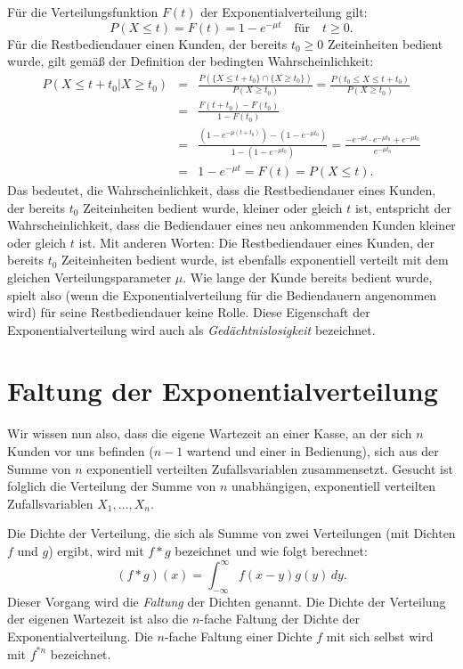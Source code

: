 \documentclass[a4paper,11pt,oneside]{article}
\begin{document}
Für die Verteilungsfunktion $F(t)$ der Exponentialverteilung gilt:
$$
P(X\le t)=F(t)=1-e^{-\mu t} \quad\text{für}\quad t\geq0.
$$
Für die Restbediendauer einen Kunden, der bereits $t_0\ge0$ Zeiteinheiten bedient wurde, gilt gemäß der Definition der bedingten Wahrscheinlichkeit:
\begin{eqnarray*}
P(X\le t+t_0|X\ge t_0)
&=&\frac{P(\{X\le t+t_0\}\cap \{X\ge t_0\})}{P(X\ge t_0)}
 = \frac{P(t_0\le X\le t+t_0)}{P(X\ge t_0)}\\
&=&\frac{F(t+t_0)-F(t_0)}{1-F(t_0)}\\
&=&\frac{(1-e^{-\mu(t+t_0)})-(1-e^{-\mu t_0})}{1-(1-e^{-\mu t_0})}
 = \frac{-e^{-\mu t}\cdot e^{-\mu t_0}+e^{-\mu t_0}}{e^{-\mu t_0}}\\
&=&1-e^{-\mu t}
 = F(t)=P(X\le t).
\end{eqnarray*}
Das bedeutet, die Wahrscheinlichkeit, dass die Restbediendauer eines Kunden, der bereits $t_0$ Zeiteinheiten bedient wurde, kleiner oder gleich $t$ ist, entspricht der Wahrscheinlichkeit, dass die Bediendauer eines neu ankommenden Kunden kleiner oder gleich $t$ ist. Mit anderen Worten: Die Restbediendauer eines Kunden, der bereits $t_0$ Zeiteinheiten bedient wurde, ist ebenfalls exponentiell verteilt mit dem gleichen Verteilungsparameter $\mu$. Wie lange der Kunde bereits bedient wurde, spielt also (wenn die Exponentialverteilung für die Bediendauern angenommen wird) für seine Restbediendauer keine Rolle. Diese Eigenschaft der Exponentialverteilung wird auch als \emph{Gedächtnislosigkeit} bezeichnet.



\section{Faltung der Exponentialverteilung}

Wir wissen nun also, dass die eigene Wartezeit an einer Kasse, an der sich $n$ Kunden vor uns befinden ($n-1$ wartend und einer in Bedienung), sich aus der Summe von $n$ exponentiell verteilten Zufallsvariablen zusammensetzt. Gesucht ist folglich die Verteilung der Summe von $n$ unabhängigen, exponentiell verteilten Zufallsvariablen $X_1,\ldots,X_n$.

Die Dichte der Verteilung, die sich als Summe von zwei Verteilungen (mit Dichten $f$ und $g$) ergibt, wird mit $f*g$ bezeichnet und wie folgt berechnet:
$$
(f*g)(x)=\int_{-\infty}^{\infty} f(x-y)g(y)\,dy.
$$
Dieser Vorgang wird die \emph{Faltung} der Dichten genannt. Die Dichte der Verteilung der eigenen Wartezeit ist also die $n$-fache Faltung der Dichte der Exponentialverteilung. Die $n$-fache Faltung einer Dichte $f$ mit sich selbst wird mit $f^{*n}$ bezeichnet.
\end{document}
